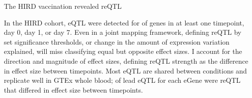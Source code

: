 The \gls{HIRD} 
vaccination revealed \gls{reQTL}

In the \gls{HIRD} cohort, 
\gls{eQTL} were detected for  of genes in at least one timepoint, day 0, day 1, or day 7.
Even in a joint mapping framework, defining \gls{reQTL} by set significance thresholds, or change in the amount of expression variation explained, will miss classifying equal but opposite effect sizes.
I account for the direction and magnitude of effect sizes, defining reQTL strength as the difference in effect size between timepoints.
Most \gls{eQTL} are shared between conditions and replicate well in GTEx whole blood;
 of lead \gls{eQTL} for each eGene were \gls{reQTL} that differed in effect size between timepoints.

